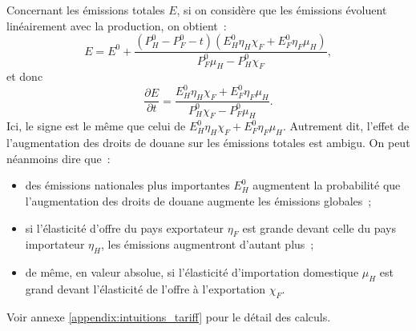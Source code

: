 Concernant les émissions totales $E$, si on considère que les émissions évoluent linéairement avec la production, on obtient~:
\begin{equation}
    E = E^0 + \frac{(P_H^0 - P_F^0 - t)(E_H^0 \eta_H \chi_F + E_F^0 \eta_F \mu_H)}{P_F^0 \mu_H - P_H^0 \chi_F},
\end{equation}
et donc
\begin{equation}\label{eq:eq_intuition_delta_em}
    \frac{\partial E}{\partial t} = \frac{E_H^0 \eta_H \chi_F + E_F^0 \eta_F \mu_H}{P_H^0 \chi_F - P_F^0 \mu_H}.
\end{equation}
Ici, le signe est le même que celui de $E_H^0 \eta_H \chi_F + E_F^0 \eta_F \mu_H$. Autrement dit, l'effet de l'augmentation des droits de douane sur les émissions totales est ambigu. On peut néanmoins dire que~:
\begin{itemize}
    \item des émissions nationales plus importantes $E_H^0$ augmentent la probabilité que l'augmentation des droits de douane augmente les émissions globales~;
    \item si l'élasticité d'offre du pays exportateur $\eta_F$ est grande devant celle du pays importateur $\eta_H$, les émissions augmentront d'autant plus~;
    \item de même, en valeur absolue, si l'élasticité d'importation domestique $\mu_H$ est grand devant l'élasticité de l'offre à l'exportation $\chi_F$.
\end{itemize}


Voir annexe \ref{appendix:intuitions_tariff} pour le détail des calculs.
